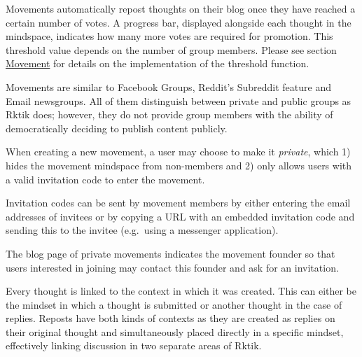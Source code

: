 
Movements automatically repost thoughts on their blog once they have
reached a certain number of votes. A progress bar, displayed alongside
each thought in the mindspace, indicates how many more votes are
required for promotion. This threshold value depends on the number of
group members. Please see section \hyperref[movement]{Movement} for
details on the implementation of the threshold function.

Movements are similar to Facebook Groups, Reddit's Subreddit feature and
Email newsgroups. All of them distinguish between private and public
groups as Rktik does; however, they do not provide group members with
the ability of democratically deciding to publish content publicly.


When creating a new movement, a user may choose to make it
\emph{private}, which 1) hides the movement mindspace from non-members
and 2) only allows users with a valid invitation code to enter the
movement.

Invitation codes can be sent by movement members by either entering the
email addresses of invitees or by copying a URL with an embedded
invitation code and sending this to the invitee (e.g.~using a messenger
application).

The blog page of private movements indicates the movement founder so
that users interested in joining may contact this founder and ask for an
invitation.


Every thought is linked to the context in which it was created. This can
either be the mindset in which a thought is submitted or another thought
in the case of replies. Reposts have both kinds of contexts as they are
created as replies on their original thought and simultaneously placed
directly in a specific mindset, effectively linking discussion in two
separate areas of Rktik.

